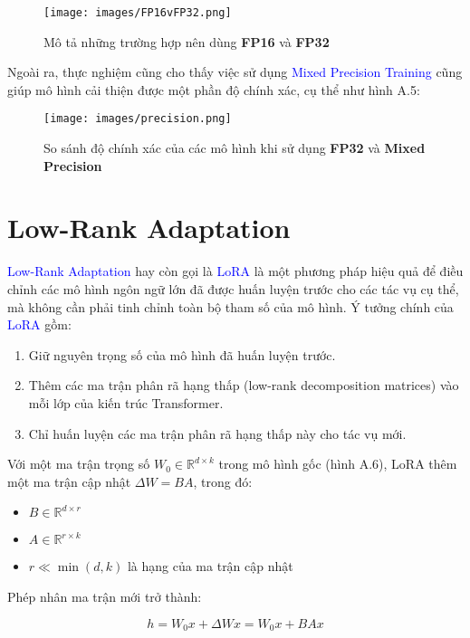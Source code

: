 {\begin{figure}[h]
    \centering
    \texttt{[image: images/FP16vFP32.png]}
    \caption{Mô tả những trường hợp nên dùng \textbf{FP16} và \textbf{FP32}}
    \label{fig:your-label}
\end{figure} 
Ngoài ra, thực nghiệm cũng cho thấy việc sử dụng \textcolor{blue}{Mixed Precision Training} cũng giúp mô hình cải thiện được một phần độ chính xác, cụ thể như hình A.5:

\begin{figure}[h]
    \centering
    \texttt{[image: images/precision.png]}
    \caption{So sánh độ chính xác của các mô hình khi sử dụng \textbf{FP32} và \textbf{Mixed Precision}}
    \label{fig:your-label}
\end{figure} 

\section{Low-Rank Adaptation}
\textcolor{blue}{Low-Rank Adaptation} hay còn gọi là \textcolor{blue}{LoRA} là một phương pháp hiệu quả để điều chỉnh các mô hình ngôn ngữ lớn đã được huấn luyện trước cho các tác vụ cụ thể, mà không cần phải tinh chỉnh toàn bộ tham số của mô hình. Ý tưởng chính của \textcolor{blue}{LoRA} gồm:
\begin{enumerate}
    \item Giữ nguyên trọng số của mô hình đã huấn luyện trước.
    \item Thêm các ma trận phân rã hạng thấp (low-rank decomposition matrices) vào mỗi lớp của kiến trúc Transformer.
    \item Chỉ huấn luyện các ma trận phân rã hạng thấp này cho tác vụ mới.
\end{enumerate}

Với một ma trận trọng số $W_0 \in \mathbb{R}^{d \times k}$ trong mô hình gốc (hình A.6), LoRA thêm một ma trận cập nhật $\Delta W = BA$, trong đó:
\begin{itemize}
    \item $B \in \mathbb{R}^{d \times r}$
    \item $A \in \mathbb{R}^{r \times k}$
    \item $r \ll \min(d,k)$ là hạng của ma trận cập nhật
\end{itemize}

Phép nhân ma trận mới trở thành:

\begin{equation}
    h = W_0x + \Delta Wx = W_0x + BAx
\end{equation}

}
